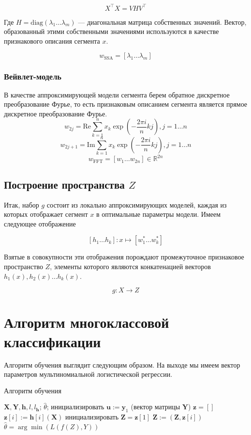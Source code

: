 \documentclass[12pt, fleqn, unicode]{article}
\newcommand{\bz}{\mathbf{z}}
\newcommand{\by}{\mathbf{y}}
\newcommand{\bY}{\mathbf{Y}}
\newcommand{\bX}{\mathbf{X}}
\newcommand{\bu}{\mathbf{u}}
\newcommand{\bh}{\mathbf{h}}
\newcommand{\bZ}{\mathbf{Z}}
\newcommand{\R}{\mathbb{R}}
\newcommand{\brs}[1]{\left(#1\right)}
\newcommand{\sbrs}[1]{\left[#1\right]}
\begin{document}
$$
X^\intercal X = VHV^\intercal
$$

Где $H = \mathrm{diag}(\lambda_1\ldots \lambda_m)$ --- диагональная матрица собственных значений.
Вектор, образованный этими собственными значениями используются в качестве
признакового описания сегмента $x$.

$$
w_{\text{SSA}} = [\lambda_1 \ldots \lambda_m]
$$

\subsubsection{Вейвлет-модель}

В качестве аппроксимирующей модели сегмента берем обратное дискретное
преобразование Фурье,
то есть признаковым описанием сегмента является прямое дискретное преобразование
Фурье.
$$
    w_{2j} = \mathrm{Re} \sum_{k=1}^{n} x_k \exp\brs{-\frac{2\pi i}{n}kj}, j=1\ldots n
$$
$$
    w_{2j + 1} = \mathrm{Im} \sum_{k=1}^{n} x_k \exp\brs{-\frac{2\pi i}{n}kj}, j=1\ldots n
$$
$$
w_{\text{FFT}} = \sbrs{w_1\ldots w_{2n}}\in \R^{2n}
$$

\subsection{Построение пространства $Z$}


Итак, набор $g$ состоит из локально аппроксимирующих моделей, каждая из которых
отображает сегмент $x$ в оптимальные параметры модели. Имеем следующее отображение

$$
[h_1\ldots h_k]: x \mapsto [w_1^* \ldots w_k^*]
$$

Взятые в совокупности эти отображения порождают промежуточное признаковое пространство
$Z$, элементы которого являются конкатенацией векторов $h_1(x), h_2(x)\ldots h_k(x)$.

$$
g: X \to Z
$$

\section{Алгоритм многоклассовой классификации}

Алгоритм обучения выглядит следующим образом. На выходе мы имеем вектор
параметров мультиномиальной логистической регрессии.

\begin{center}
\begin{algorithm}[h]
\caption{Алгоритм обучения}
    \label{learn}
\begin{algorithmic}[1]
\REQUIRE $\bX, \bY, \bh, l, l_\bh$;
\ENSURE $\hat{\theta}$;
\STATE инициализировать $\bu := \by_1$ (вектор матрицы $\bY$)
\STATE $\bz = []$
\FOR{$i=1,\dots, l_\bh$}
    $\bz[i] := \bh[i](\bX)$
\ENDFOR
\STATE инициализировать $\bZ = \bz[1]$
\FOR{$i=2,\dots, l_\bh$}
    $\bZ  := (\bZ, \bz[i])$
\ENDFOR
\STATE $\hat{\theta} = \arg\min(L(f(Z), Y))$
\end{algorithmic}
\end{algorithm}
\end{center}
\end{document}

